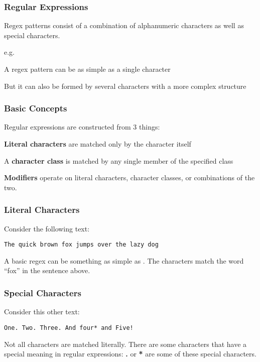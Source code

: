 \documentclass[12pt]{beamer}\usepackage[]{graphicx}\usepackage[]{color}
\begin{document}
\begin{frame}
\frametitle{Regular Expressions}

\bi
  \item Regex patterns consist of a combination of alphanumeric characters as well as special characters.
  \bi
    \item e.g. \code{[a-zA-Z0-9\_.]*}
  \ei
  \item A regex pattern can be as simple as a single character
  \item But it can also be formed by several characters with a more complex structure
\ei

\end{frame}


\begin{frame}
\frametitle{Basic Concepts}

Regular expressions are constructed from 3 things:
\bbi
  \item \textbf{Literal characters} are matched only by the character itself
  \item A \textbf{character class} is matched by any single member of the specified class
  \item \textbf{Modifiers} operate on literal characters, character classes, or combinations of the two.
\ei

\end{frame}


\begin{frame}[fragile]
\frametitle{Literal Characters}

Consider the following text:
\begin{verbatim}
The quick brown fox jumps over the lazy dog
\end{verbatim}

\bigskip

A basic regex can be something as simple as {\hilit {}}. The characters  match the word ``fox'' in the sentence above.

\end{frame}


\begin{frame}[fragile]
\frametitle{Special Characters}

Consider this other text:
\begin{verbatim}
One. Two. Three. And four* and Five!
\end{verbatim}

\bigskip

Not all characters are matched literally. There are some characters that have a special meaning in regular expressions: \textbf{.} or \textbf{*} are some of these special characters.

\end{frame}
\end{document}

